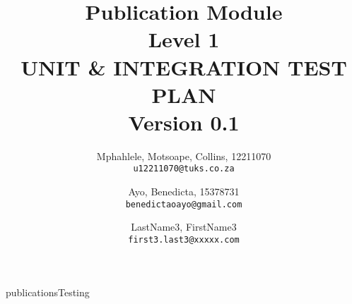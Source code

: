 \documentclass[a4paper]{article}
\title{Publication Module\\
	Level 1\\
	UNIT \& INTEGRATION TEST PLAN\\
	Version 0.1
}
\author{
	Mphahlele, Motsoape, Collins, 12211070\\
	\texttt{u12211070@tuks.co.za}
	\and
	Ayo, Benedicta, 15378731\\
	\texttt{benedictaoayo@gmail.com}
	\and
	LastName3, FirstName3\\
	\texttt{first3.last3@xxxxx.com}
}
\begin{document}
\maketitle
\newpage
\tableofcontents

\newpage
{publicationsTesting}
\end{document}
